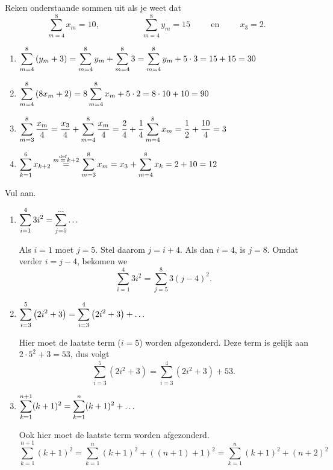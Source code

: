 \documentclass{ximera}
\begin{document}
\begin{voorbeeldoefening}
Reken onderstaande sommen uit als je weet dat
\[\sum^{8}_{m=4}x_{m}=10,\qquad\qquad\quad\sum^{8}_{m=4}y_{m}=15\qquad\ \ \textrm{en}\ \ \qquad x_{3}=2.\]
\begin{enumerate}
\item $\displaystyle{\sum^{8}_{m=4}\left(y_{m}+3\right)=\sum^{8}_{m=4}y_m+\sum^{8}_{m=4}3=\sum^{8}_{m=4}y_{m}+5\cdot 3=15+15=30}$
\item $\displaystyle{\sum^{8}_{m=4}\left(8x_{m}+2\right)=8\sum^{8}_{m=4}x_{m}+5\cdot 2=8\cdot 10+10=90}$
\item $\displaystyle{\sum^{8}_{m=3}\frac{x_{m}}{4}=\frac{x_{3}}{4}+\sum^{8}_{m=4}\frac{x_{m}}{4}=\frac{2}{4}+\frac{1}{4}\sum^{8}_{m=4}x_{m}=\frac{1}{2}+\frac{10}{4}=3}$
\item $\displaystyle{\sum^{6}_{k=1}x_{k+2}\overset{m\overset{\mathrm{def}}{=}k+2}{=}\sum^8_{m=3}x_m=x_3+\sum^8_{m=4}x_k=2+10=12}$
\end{enumerate}
\end{voorbeeldoefening}
\begin{voorbeeldoefening}
Vul aan.
\begin{enumerate}
\item $\displaystyle{\sum^{4}_{i=1}3i^{2}=\sum^{\ldots}_{j=5}\ldots}$
\begin{procedure} Als $i=1$ moet $j=5$. Stel daarom $j=i+4$. Als dan $i=4$, is
$j=8$. Omdat verder $i=j-4$, bekomen we
\[\sum^{4}_{i=1}3i^{2}=\sum^{8}_{j=5}3(j-4)^2.\]
\end{procedure}
\item $\displaystyle{\sum^{5}_{i=3}\left(2i^2+3\right)=\sum^{4}_{i=3}\left(2i^2+3\right)+\ldots}$
\begin{procedure} Hier moet de laatste term ($i=5$) worden afgezonderd. Deze
term is gelijk aan $2\cdot5^2+3=53$, dus volgt
\[\sum^5_{i=3}\left(2i^2+3\right)=\sum^4_{i=3}\left(2i^2+3\right)+53.\]
\end{procedure}
\item $\displaystyle{\sum^{n+1}_{k=1}(k+1)^2=\sum^n_{k=1}(k+1)^2+\ldots}$
\begin{procedure} Ook hier moet de laatste term worden afgezonderd.
\[\sum^{n+1}_{k=1}(k+1)^{2}=\sum^n_{k=1}(k+1)^2+\left((n+1)+1\right)^2=\sum^n_{k=1}(k+1)^{2}+(n+2)^2\]
\end{procedure}~
\end{enumerate}
\end{voorbeeldoefening}
\eindeletternummering
\end{document}
